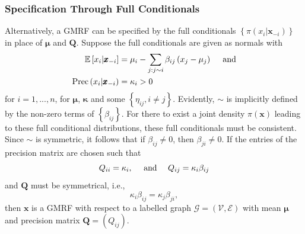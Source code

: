 \subsubsection{Specification Through Full Conditionals}
Alternatively, a GMRF can be specified by the full conditionals $\left\lbrace\pi\left(x_i|\pmb{x}_{-i}\right)\right\rbrace$ in place of $\pmb{\mu}$ and $\pmb{Q}$. Suppose the full conditionals are given as normals with
\begin{align}
    \mathbb{E}\left[x_i|\pmb{x}_{-i}\right] &= \mu_i-\sum_{j:j\sim i}\beta_{ij}\left(x_j-\mu_j\right)\hspace{10pt}\hbox{ and}\\
    \hbox{Prec}\left(x_i|\pmb{x}_{-i}\right) &= \kappa_i>0
\end{align}
for $i=1,...,n$, for $\pmb{\mu}$, $\pmb{\kappa}$ and some $\left\lbrace\eta_{ij},i\neq j\right\rbrace$. Evidently, $\sim$ is implicitly defined by the non-zero terms of $\left\lbrace\beta_{ij}\right\rbrace$. For there to exist a joint density $\pi\left(\pmb{x}\right)$ leading to these full conditional distributions, these full conditionals must be consistent. Since $\sim$ is symmetric, it follows that if $\beta_{ij}\neq 0$, then $\beta_{ji}\neq0$. If the entries of the precision matrix are chosen such that
\begin{equation*}
    Q_{ii}=\kappa_i, \hspace{10pt}\hbox{ and }\hspace{10pt} Q_{ij}=\kappa_i\beta_{ij}
\end{equation*}
and $\pmb{Q}$ must be symmetrical, i.e.,
\begin{equation*}
    \kappa_i\beta_{ij}=\kappa_j\beta_{ji},
\end{equation*}
then $\pmb{x}$ is a GMRF with respect to a labelled graph $\mathcal{G}=\left(\mathcal{V}, \mathcal{E}\right)$ with mean $\pmb{\mu}$ and precision matrix $\pmb{Q}=\left(Q_{ij}\right)$.
